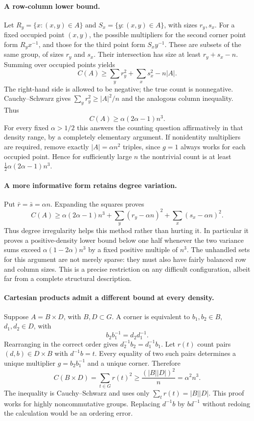 \documentclass[11pt,a4paper]{article}
\begin{document}
\paragraph{A row-column lower bound.}
Let $R_y=\{x:(x,y)\in A\}$ and $S_x=\{y:(x,y)\in A\}$, with sizes $r_y,s_x$. For a fixed occupied point $(x,y)$, the possible multipliers for the second corner point form $R_yx^{-1}$, and those for the third point form $S_xy^{-1}$. These are subsets of the same group, of sizes $r_y$ and $s_x$. Their intersection has size at least $r_y+s_x-n$. Summing over occupied points yields
\[
 C(A)\geq\sum_y r_y^2+\sum_xs_x^2-n|A|.
\]
The right-hand side is allowed to be negative; the true count is nonnegative. Cauchy--Schwarz gives $\sum_y r_y^2\geq |A|^2/n$ and the analogous column inequality. Thus
\[
 C(A)\geq\alpha(2\alpha-1)n^3.
\]
For every fixed $\alpha>1/2$ this answers the counting question affirmatively in that density range, by a completely elementary argument. If nonidentity multipliers are required, remove exactly $|A|=\alpha n^2$ triples, since $g=1$ always works for each occupied point. Hence for sufficiently large $n$ the nontrivial count is at least $\tfrac12\alpha(2\alpha-1)n^3$.

\paragraph{A more informative form retains degree variation.}
Put $\bar r=\bar s=\alpha n$. Expanding the squares proves
\[
 C(A)\geq\alpha(2\alpha-1)n^3
 +\sum_y(r_y-\alpha n)^2+\sum_x(s_x-\alpha n)^2.
\]
Thus degree irregularity helps this method rather than hurting it. In particular it proves a positive-density lower bound below one half whenever the two variance sums exceed $\alpha(1-2\alpha)n^3$ by a fixed positive multiple of $n^3$. The unhandled sets for this argument are not merely sparse: they must also have fairly balanced row and column sizes. This is a precise restriction on any difficult configuration, albeit far from a complete structural description.

\paragraph{Cartesian products admit a different bound at every density.}
Suppose $A=B\times D$, with $B,D\subset G$. A corner is equivalent to $b_1,b_2\in B$, $d_1,d_2\in D$, with
\[
 b_2b_1^{-1}=d_2d_1^{-1}.
\]
Rearranging in the correct order gives $d_2^{-1}b_2=d_1^{-1}b_1$. Let $r(t)$ count pairs $(d,b)\in D\times B$ with $d^{-1}b=t$. Every equality of two such pairs determines a unique multiplier $g=b_2b_1^{-1}$ and a unique corner. Therefore
\[
 C(B\times D)=\sum_{t\in G}r(t)^2
 \geq\frac{(|B||D|)^2}{n}=\alpha^2n^3.
\]
The inequality is Cauchy--Schwarz and uses only $\sum_t r(t)=|B||D|$. This proof works for highly noncommutative groups. Replacing $d^{-1}b$ by $bd^{-1}$ without redoing the calculation would be an ordering error.
\end{document}
